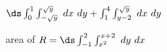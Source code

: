 {$\ds \int_{0}^{1}\int_{-\sqrt{y}}^{\sqrt{y}} \ dx \ dy+\int_{1}^{4}\int_{y-2}^{\sqrt{y}} \ dx \ dy$
}
{\noindent \begin{minipage}{\linewidth}
\end{minipage}

area of $R = \ds \int_{-1}^2\int_{x^2}^{x+2} \ dy \ dx $

}
